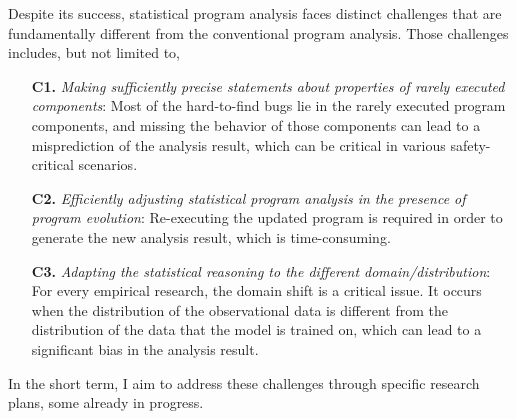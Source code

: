 \documentclass{article}
\begin{document}



\noindent Despite its success, statistical program analysis faces distinct challenges that are fundamentally different from the conventional program analysis. Those challenges includes, but not limited to, 
\begin{itemize}[leftmargin=20pt, topsep=2pt, parsep=0pt, partopsep=0pt, label={-}]
  \item[\textbf{C1.}] \emph{Making sufficiently precise statements about properties of rarely executed components}: Most of the hard-to-find bugs lie in the rarely executed program components, and missing the behavior of those components can lead to a misprediction of the analysis result, which can be critical in various safety-critical scenarios.
  \item[\textbf{C2.}] \emph{Efficiently adjusting statistical program analysis in the presence of program evolution}: Re-executing the updated program is required in order to generate the new analysis result, which is time-consuming.
  \item[\textbf{C3.}] \emph{Adapting the statistical reasoning to the different domain/distribution}: For every empirical research, the domain shift is a critical issue. It occurs when the distribution of the observational data is different from the distribution of the data that the model is trained on, which can lead to a significant bias in the analysis result.
\end{itemize}
In the short term, I aim to address these challenges through specific research plans, some already in progress.
\end{document}
